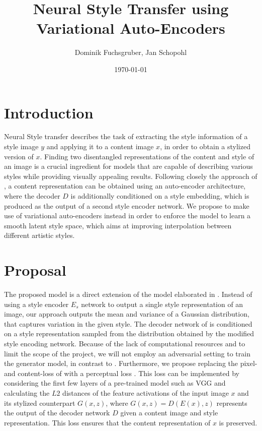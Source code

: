 \documentclass[twoside,twocolumn]{article}
\title{Neural Style Transfer using Variational Auto-Encoders} %
\author{Dominik Fuchsgruber, Jan Schopohl}
\date{\today} %
\begin{document}
\maketitle

\section{Introduction}

Neural Style transfer describes the task of extracting the style information of a style image $y$ and applying it to a content image $x$, in order to obtain a stylized version of $x$. Finding two disentangled representations of the content and style of an image is a crucial ingredient for models that are capable of describing various styles while providing visually appealing results. Following closely the approach of \cite{Kotovenko_2019_ICCV}, a content representation can be obtained using an auto-encoder architecture, where the decoder $D$ is additionally conditioned on a style embedding, which is produced as the output of a second style encoder network. We propose to make use of variational auto-encoders \cite{vae} instead in order to enforce the model to learn a smooth latent style space, which aims at improving interpolation between different artistic styles. 

\section{Proposal}

The proposed model is a direct extension of the model elaborated in \cite{Kotovenko_2019_ICCV}. Instead of using a style encoder $E_s$ network to output a single style representation of an image, our approach outputs the mean and variance of a Gaussian distribution, that captures variation in the given style. The decoder network of \cite{Kotovenko_2019_ICCV} is conditioned on a style representation sampled from the distribution obtained by the modified style encoding network. Because of the lack of computational resources and to limit the scope of the project, we will not employ an adversarial setting to train the generator model, in contrast to \cite{Kotovenko_2019_ICCV}. Furthermore, we propose replacing the pixel- and content-loss of \cite{Kotovenko_2019_ICCV} with a perceptual loss \cite{johnson}. This loss can be implemented by considering the first few layers of a pre-trained model such as VGG and calculating the $L2$ distances of the feature activations of the input image $x$ and its stylized counterpart $G(x, z)$, where $G(x, z) = D(E(x), z)$ represents the output of the decoder network $D$ given a content image and style representation.
This loss ensures that the content representation of $x$ is preserved.
\end{document}
